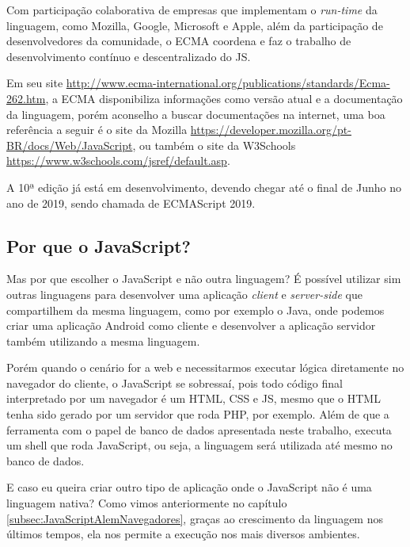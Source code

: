 \documentclass[
	12pt,				%
	openright,			%
	twoside,			%
	a4paper,			%
	english,			%
	brazil				%
	]{abntex2}
\begin{document}
Com participação colaborativa de empresas que implementam o \textit{run-time} da linguagem, como Mozilla, Google, Microsoft e Apple, além da participação de desenvolvedores da comunidade, o ECMA coordena e faz o trabalho de desenvolvimento contínuo e descentralizado do JS.

Em seu site \url{http://www.ecma-international.org/publications/standards/Ecma-262.htm}, a ECMA disponibiliza informações como versão atual e a documentação da linguagem, porém aconselho a buscar documentações na internet, uma boa referência a seguir é o site da Mozilla \url{https://developer.mozilla.org/pt-BR/docs/Web/JavaScript}, ou também o site da W3Schools \url{https://www.w3schools.com/jsref/default.asp}. 

A 10ª edição já está em desenvolvimento, devendo chegar até o final de Junho no ano de 2019, sendo chamada de ECMAScript 2019.

\subsection{Por que o JavaScript?}
Mas por que escolher o JavaScript e não outra linguagem? É possível utilizar sim outras linguagens para desenvolver uma aplicação \textit{client} e \textit{server-side} que compartilhem da mesma linguagem, como por exemplo o Java, onde podemos criar uma aplicação Android como cliente e desenvolver a aplicação servidor também utilizando a mesma linguagem.

Porém quando o cenário for a web e necessitarmos executar lógica diretamente no navegador do cliente, o JavaScript se sobressaí, pois todo código final interpretado por um navegador é um HTML, CSS e JS, mesmo que o HTML tenha sido gerado por um servidor que roda PHP, por exemplo. Além de que a ferramenta com o papel de banco de dados apresentada neste trabalho, executa um shell que roda JavaScript, ou seja, a linguagem será utilizada até mesmo no banco de dados.

E caso eu queira criar outro tipo de aplicação onde o JavaScript não é uma linguagem nativa? Como vimos anteriormente no capítulo \ref{subsec:JavaScriptAlemNavegadores}, graças ao crescimento da linguagem nos últimos tempos, ela nos permite a execução nos mais diversos ambientes. 
\end{document}
